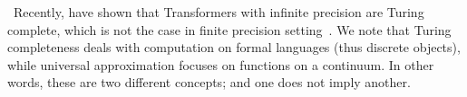 ~Recently, \citet{perez2019turing} have shown that Transformers with infinite precision are Turing complete, which is not the case in finite precision setting~\citep{dehghani2018universal}. We note that Turing completeness deals with computation on formal languages (thus discrete objects), while universal approximation focuses on functions on a continuum. In other words, these are two different concepts; and one does not imply another.






